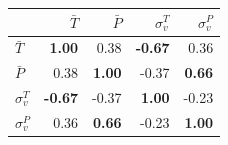 \begin{tabular}{lrrrr}
\toprule
 & $\bar T$ & $\bar P$ & $\sigma_v^T$ & $\sigma_v^P$ \\
\midrule
$\bar T$ & \textbf{1.00} & 0.38 & \textbf{-0.67} & 0.36 \\
$\bar P$ & 0.38 & \textbf{1.00} & -0.37 & \textbf{0.66} \\
$\sigma_v^T$ & \textbf{-0.67} & -0.37 & \textbf{1.00} & -0.23 \\
$\sigma_v^P$ & 0.36 & \textbf{0.66} & -0.23 & \textbf{1.00} \\
\bottomrule
\end{tabular}
